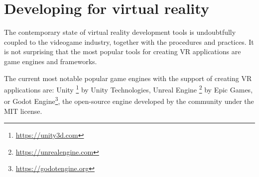 \hypertarget{x-developing-for-virtual-reality}{\section{Developing for virtual reality}}
The contemporary state of virtual reality development tools is undoubtfully
coupled to the videogame industry, together with the procedures and practices.
It is not surprising that the most popular tools for creating
VR applications are game engines and frameworks.


The current most notable popular game engines with the support of creating VR
applications are: Unity \footnote{\href{https://unity3d.com}{https://unity3d.com}} by
Unity Technologies, Unreal Engine \footnote{\href{https://unrealengine.com}{https://unrealengine.com}} by
Epic Games, or Godot Engine\footnote{\href{https://godotengine.org}{https://godotengine.org}},
the open-source engine developed by the community under the MIT license. \cite{slantvr}
